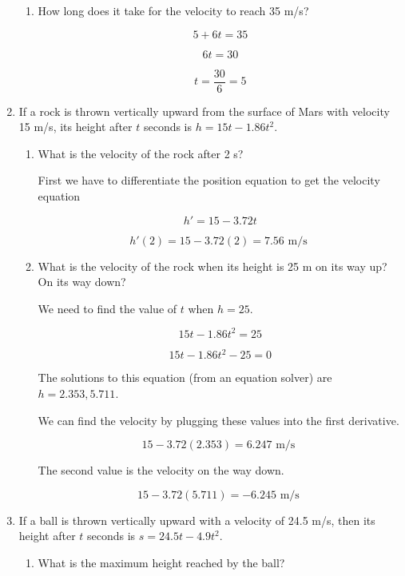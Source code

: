\documentclass{article}
\begin{document}
\begin{enumerate}
\begin{enumerate}
				\item How long does it take for the velocity to reach 35 m/s?

					$$5 + 6t = 35$$

					$$6t = 30$$

					$$t = \frac{30}{6} = 5$$
			\end{enumerate}

			\item If a rock is thrown vertically upward from the surface of Mars with
				velocity 15 m/s, its height after $t$ seconds is $h = 15t - 1.86t^2$.

				\begin{enumerate}
					\item What is the velocity of the rock after 2 s?

						First we have to differentiate the position equation to
						get the velocity equation

						$$h' = 15 - 3.72t$$

						$$h'(2) = 15 - 3.72(2) = 7.56 \text{ m/s }$$

					\item What is the velocity of the rock when its height is 25 m
						on its way up? On its way down?

						We need to find the value of $t$ when $h = 25$.

						$$15t - 1.86t^2 = 25$$

						$$15t - 1.86t^2 - 25 = 0$$

						The solutions to this equation (from an equation solver)
						are $h = 2.353, 5.711$.

						We can find the velocity by plugging these values into the 
						first derivative.

						$$15 - 3.72(2.353) = 6.247 \text{ m/s }$$

						The second value is the velocity on the way down.

						$$15 - 3.72(5.711) = -6.245 \text{ m/s }$$

				\end{enumerate}

		\item If a ball is thrown vertically upward with a velocity of 24.5 m/s, then its height
			after $t$ seconds is $s = 24.5t - 4.9t^2$.

				\begin{enumerate}

					\item What is the maximum height reached by the ball?


\end{enumerate}
\end{enumerate}
\end{document}

